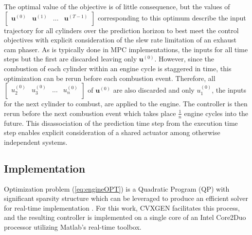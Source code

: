 The optimal value of the objective is of little consequence, but the values of $\left[\begin{array}{cccc}\mathbf{u}^{(0)} & \mathbf{u}^{(1)} & \hdots & \mathbf{u}^{(T-1)} \\\end{array}\right]$ corresponding to this optimum describe the input trajectory for all cylinders over the prediction horizon to best meet the control objectives with explicit consideration of the slew rate limitation of an exhaust cam phaser. As is typically done in MPC implementations, the inputs for all time steps but the first are discarded leaving only $\mathbf{u}^{(0)}$. However, since the combustion of each cylinder within an engine cycle is staggered in time, this optimization can be rerun before each combustion event. Therefore, all $\left[\begin{array}{cccc}{u}_2^{(0)} & {u}_3^{(0)} & \hdots & {u}_{n}^{(0)} \\\end{array}\right]$ of $\mathbf{u}^{(0)}$ are also discarded and only ${u}_1^{(0)}$, the inputs for the next cylinder to combust, are applied to the engine. The controller is then rerun before the next combustion event which takes place $\frac{1}{n}$ engine cycles into the future. This disassociation of the prediction time step from the execution time step enables explicit consideration of a shared actuator among otherwise independent systems.

\subsection{Implementation}
Optimization problem (\ref{eq:engineOPT}) is a Quadratic Program (QP) with significant sparsity structure which can be leveraged to produce an efficient solver for real-time implementation \cite{Mattingley2010}. For this work, CVXGEN \cite{CVXGEN} facilitates this process, and the resulting controller is implemented on a single core of an Intel Core2Duo processor utilizing Matlab's real-time toolbox.

